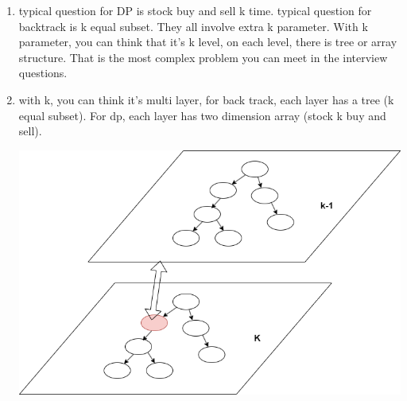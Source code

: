 \documentclass[a4paper,11pt,twoside]{book}
\begin{document}
\begin{itemize}
\begin{enumerate}
		\item typical question for DP is stock buy and sell k time.  typical question for backtrack is k equal subset. They all involve extra k parameter. With k parameter, you can think that it's k level, on each level, there is tree or array structure. That is the most complex problem you can meet in the interview questions. 
		
		\item with k, you can think it's multi layer, for back track, each layer has a tree (k equal subset). For dp, each layer has two dimension array (stock k buy and sell).

\begin{center}
	\includegraphics[scale=0.55]{pics/dp_back.drawio.png}
\end{center}

		
	\end{enumerate}
	
	  
\end{itemize}
\end{document}
